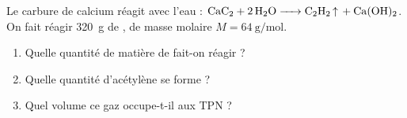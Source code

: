 \documentclass[11pt,a4paper]{article}
\begin{document}
\begin{exo}
Le carbure de calcium réagit avec l'eau : $\ce{CaC2 + 2 H2O -> C2H2 ^ + Ca(OH)2}$. On fait réagir
\qty{320}{\gram} de , de masse molaire $M=\qty{64}{\gram\per\mole}$.
\begin{enumerate}[label=\alph*)]
  \item Quelle quantité de matière de  fait-on réagir ?
  \item Quelle quantité d'acétylène  se forme ?
  \item Quel volume ce gaz occupe-t-il aux TPN ?
\end{enumerate}
\end{exo}
\end{document}
